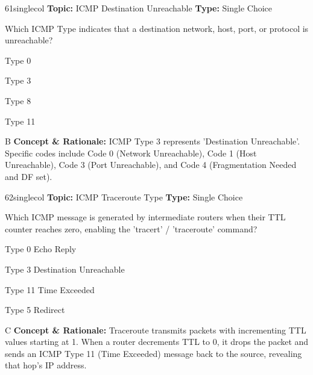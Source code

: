 \begin{qcard}{61}{singlecol}
\textcolor{darkslate!75}{\small\textbf{Topic:} ICMP Destination Unreachable \hfill \textbf{Type:} Single Choice}\vspace{0.4em}\par
Which ICMP Type indicates that a destination network, host, port, or protocol is unreachable?
\begin{qoptions}
\item Type 0
\item Type 3
\item Type 8
\item Type 11
\end{qoptions}
\end{qcard}
\nopagebreak
\begin{explainbox}{B}
\textbf{Concept \& Rationale:} ICMP Type 3 represents 'Destination Unreachable'. Specific codes include Code 0 (Network Unreachable), Code 1 (Host Unreachable), Code 3 (Port Unreachable), and Code 4 (Fragmentation Needed and DF set).
\end{explainbox}

\begin{qcard}{62}{singlecol}
\textcolor{darkslate!75}{\small\textbf{Topic:} ICMP Traceroute Type \hfill \textbf{Type:} Single Choice}\vspace{0.4em}\par
Which ICMP message is generated by intermediate routers when their TTL counter reaches zero, enabling the 'tracert' / 'traceroute' command?
\begin{qoptions}
\item Type 0 Echo Reply
\item Type 3 Destination Unreachable
\item Type 11 Time Exceeded
\item Type 5 Redirect
\end{qoptions}
\end{qcard}
\nopagebreak
\begin{explainbox}{C}
\textbf{Concept \& Rationale:} Traceroute transmits packets with incrementing TTL values starting at 1. When a router decrements TTL to 0, it drops the packet and sends an ICMP Type 11 (Time Exceeded) message back to the source, revealing that hop's IP address.
\end{explainbox}

